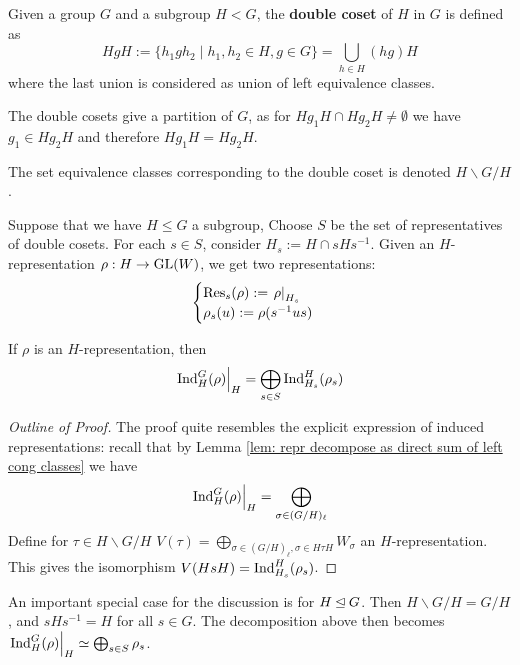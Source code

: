 \begin{definition}
    Given a group $G$ and a subgroup $H < G$, the \textbf{double coset} of $H$ in $G$ is defined as
    \[
        HgH := \{ h_1 g h_2 \mid h_1, h_2 \in H, g \in G \} = \bigcup_{h \in H} (hg) H
    \]
    where the last union is considered as union of left equivalence classes.
\end{definition}

\begin{remark}
    The double cosets give a partition of $G$, as for $H g_1 H \cap H g_2 H \neq \emptyset$ we have $g_1 \in H g_2 H$ and therefore $H g_1 H = H g_2 H$.
\end{remark}

\begin{notation}
    The set equivalence classes corresponding to the double coset is denoted $H \backslash G / H$.
\end{notation}

Suppose that we have $H \leq G$ a subgroup, Choose $S$ be the set of representatives of double cosets. For each $s \in S$, consider $H_s := H \cap s H s^{-1}$. Given an $H$-representation $\rho: H \to \mathrm{GL}(W)$, we get two representations:
\[
    \begin{cases}
        \mathrm{Res}_s (\rho) := \left.\rho\right|_{H_s} \\
        \rho_s(u) := \rho(s^{-1} u s)
    \end{cases}
\]

\begin{theorem}\label{thm: decomposition of restrction of induced repr}
    If $\rho$ is an $H$-representation, then
    \[
        \left.\mathrm{Ind}_H^G (\rho)\right|_{H} = \bigoplus_{s \in S} \mathrm{Ind}_{H_s}^H (\rho_s)
    \]
\end{theorem}

\begin{proof}[Outline of Proof]
    The proof quite resembles the explicit expression of induced representations: recall that by Lemma \ref{lem: repr decompose as direct sum of left cong classes} we have
    \[
        \left.\mathrm{Ind}_H^G (\rho)\right|_{H} = \bigoplus_{\sigma \in (G/H)_{\ell}}
    \]
    Define for $\tau \in H\backslash G/H$ $V(\tau) = \bigoplus_{\sigma \in (G/H)_{\ell}, \sigma \in H\tau H} W_{\sigma}$ an $H$-representation. This gives the isomorphism $V(HsH) = \mathrm{Ind}_{H_s}^H (\rho_s)$.
\end{proof}

\begin{remark}
    An important special case for the discussion is for $H \unlhd G$. Then $H \backslash G/H = G/H$, and $sHs^{-1} = H$ for all $s \in G$. The decomposition above then becomes $\left.\mathrm{Ind}_H^G (\rho)\right|_{H} \simeq \bigoplus_{s \in S} \rho_s$.
\end{remark}

